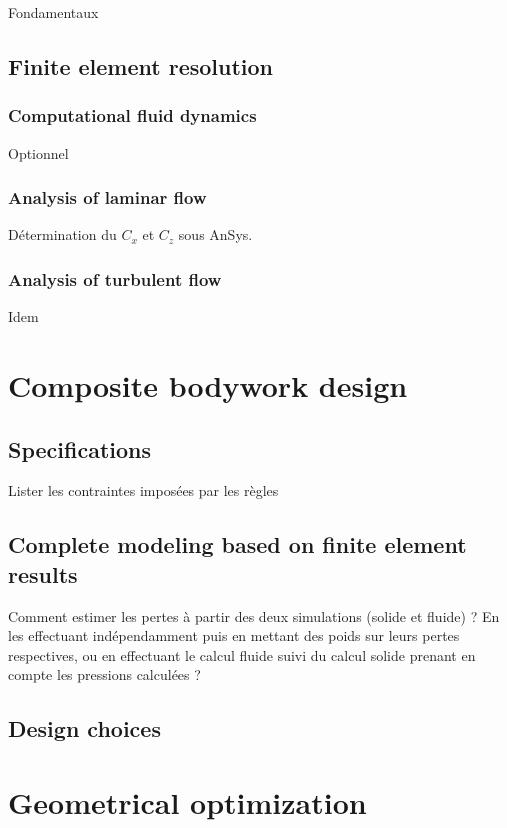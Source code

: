 \documentclass{article}
\begin{document}
Fondamentaux

\subsection{Finite element resolution}

\subsubsection{Computational fluid dynamics}

Optionnel

\subsubsection{Analysis of laminar flow}

Détermination du $C_x$ et $C_z$ sous AnSys.

\subsubsection{Analysis of turbulent flow}

Idem

\section{Composite bodywork design}

\subsection{Specifications}

Lister les contraintes imposées par les règles

\subsection{Complete modeling based on finite element results}

Comment estimer les pertes à partir des deux simulations (solide et fluide) ? En les effectuant indépendamment puis en mettant des poids sur leurs pertes respectives, ou en effectuant le calcul fluide suivi du calcul solide prenant en compte les pressions calculées ? 

\subsection{Design choices}

\section{Geometrical optimization}
\end{document}

